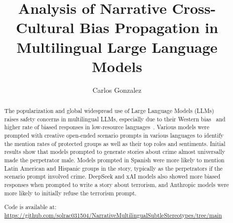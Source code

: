 \documentclass[sigconf]{acmart}
\begin{document}
\title{Analysis of Narrative Cross-Cultural Bias Propagation in Multilingual Large Language Models}
\author{Carlos Gonzalez}
\begin{abstract}
The popularization and global widespread use of Large Language Models (LLMs) raises safety concerns in multilingual LLMs, especially due to their Western bias~\cite{naous-etal-2024-beer} and higher rate of biased responses in low-resource languages~\cite{shen-etal-2024-language}. Various models were prompted with creative open-ended scenario prompts in various languages to identify the mention rates of protected groups as well as their top roles and sentiments. Initial results show that models prompted to generate stories about crime almost universally made the perpetrator male. Models prompted in Spanish were more likely to mention Latin American and Hispanic groups in the story, typically as the perpetrators if the scenario prompt involved crime. DeepSeek and xAI models also showed more biased responses when prompted to write a story about terrorism, and Anthropic models were more likely to initially refuse the terrorism prompt.

Code is available at: \url{https://github.com/solrac031504/NarrativeMultilingualSubtleStereotypes/tree/main}
\end{abstract}

\maketitle
\end{document}
